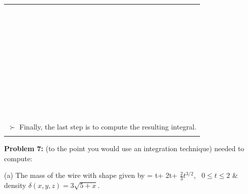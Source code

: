 \documentclass[12pt]{amsart}
\numberwithin{equation}{section}
\begin{document}
{{\begin{tabular}{| p{19.4cm} |}
	\\\\\\\\\\\\\\\\\\\\\\\\\\\\\\\\\\\\\\\\\\\\\\\\\\\\\\\\\\\\\\\\\\\\\\\\\\\\\\\\\\\\\\\\\\
	$\succ$ Finally, the last step is to compute the resulting integral. \\\\
	\hline
\end{tabular}}

\thispagestyle{empty}
\newpage
\thispagestyle{empty}

{\bf Problem 7:}  (to the point you would use an integration technique) needed to compute:

(a) The mass of the wire with shape given by \RT = t\VI + 2t\VJ + $\frac{2}{3}t^{3/2}$\VK, \, $0 \le t \le 2$ \& density $\delta(x,y,z) = 3\sqrt{5+x}$.

\vspace{11.0cm}

}
\end{document}
